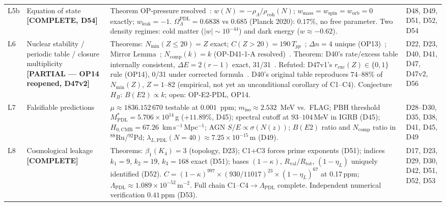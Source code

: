 \documentclass[11pt,a4paper]{article}
\newcommand{\Rval}{R_{\mathrm{val}}}
\theoremstyle{plain}
\theoremstyle{definition}
\theoremstyle{remark}
\newcommand{\Rtot}{R_{\mathrm{tot}}}
\newcommand{\Tpp}{T_{pp}}
\newcommand{\rhocoh}{\rho_{\mathrm{coh}}}
\begin{document}
\begin{longtable}{L{0.6cm}L{3.0cm}L{5.5cm}L{4.0cm}}
L5b & Equation of state \textbf{[COMPLETE, D54]} & \textcolor{proofblue}{Theorem} OP-pressure resolved~\cite{D54}: $w(N) = -\rho_\Lambda/\rhocoh(N)$; $w_{\mathrm{mass}}=w_{\mathrm{spin}}=w_{\mathrm{orb}}=0$ exactly; $w_{\mathrm{leak}}=-1$. $\Omega_\Lambda^{\mathrm{PDL}}=0.6838$ vs $0.685$ (Planck 2020): $0.17\%$, no free parameter. Two density regimes: cold matter ($|w|\sim 10^{-44}$) and dark energy ($w \approx -0.62$). & D48, D49, D51, D52, D54\\[0.4em]
L6 & Nuclear stability / periodic table / closure multiplicity \textbf{[PARTIAL --- OP14 reopened, D47v2]} & \textcolor{proofblue}{Theorems}: $N_{\min}(Z\leq20)=Z$ exact; $C(Z>20)=190\,\Tpp$~\cite{D40}; $\Delta n=4$ unique (OP13)~\cite{D47}; Mirror Lemma~\cite{D47}; $N_{\mathrm{comp}}(k)=k$ (OP-D41-1-A resolved)~\cite{D56}. \textcolor{proofblue}{Theorem}: D40's rate/excess table internally consistent, $\Delta E=2(r-1)$ exact, 31/31~\cite{D47v2}. \textcolor{negativered}{Refuted}: D47v1's $r_{\mathrm{exc}}(Z)\in\{0,1\}$ rule (OP14), 0/31 under corrected formula~\cite{D47v2}. D40's original table reproduces $74$--$88\%$ of $N_{\min}(Z)$, $Z=1$--82 (empirical, not yet an unconditional corollary of C1--C4). \textcolor{conjecturegreen}{Conjecture} $H_B$: $B(E2)\propto k$; open: OP-E2-PDL, OP14. & D22, D23, D40, D41, D47, D47v2, D56\\[0.4em]
L7 & Falsifiable predictions & $\mu\approx 1836.152\,670$ testable at $0.001$~ppm; $m_{\mathrm{iso}}\approx 2.532$~MeV vs.\ FLAG; PBH threshold $M^*_{\mathrm{PDL}}=5.706\times10^{14}$\,g ($+11.89\%$, D45); spectral cutoff at $93$--$104$\,MeV in IGRB (D45); $H_{0,\mathrm{CMB}}=67.26$~km\,s$^{-1}$\,Mpc$^{-1}$; AGN $S/E \propto \sigma(N(z))$; $B(E2)$ ratio and $N_{\mathrm{comp}}$ ratio in $^{88}$Ru/$^{92}$Pd; $\lambda_{L,\mathrm{PDL}}(N=40) \approx 7.25\times10^{-15}$\,m (D49). & D28--D30, D35, D38, D41, D45, D49\\[0.3em]
L8 & Cosmological leakage \textbf{[COMPLETE]} & \textcolor{proofblue}{Theorems}: $\beta_1(K_4)=3$ (topology, D23); C1+C3 forces prime exponents (D51); indices $k_1=9$, $k_2=19$, $k_3=168$ exact (D51); bases $(1-\kappa)$, $\Rval/\Rtot$, $(1-\eta_L)$ uniquely identified (D52). $C=(1-\kappa)^{997}\times(930/11017)^{23}\times(1-\eta_L)^{67}$ at 0.17\,ppm; $\Lambda_{\mathrm{PDL}}\approx 1.089\times10^{-52}$\,m$^{-2}$. Full chain $\mathrm{C1\text{--}C4}\to\Lambda_{\mathrm{PDL}}$ complete. Independent numerical verification $0.41$\,ppm (D53). & D17, D23, D29, D30, D42, D51, D52, D53\\[0.3em]

\end{longtable}
\end{document}
